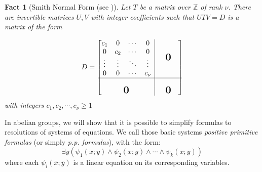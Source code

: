 \documentclass[11pt]{amsart}
\newcommand{\bigzero}{\mbox{\normalfont\Large\bfseries 0}}
\newcommand{\rvline}{\hspace*{-\arraycolsep}\vline\hspace*{-\arraycolsep}}
\newtheorem{fact}[prop]{Fact}
\theoremstyle{definition}
\newcommand{\bh}{\begin{fact}}
\newcommand{\eh}{\end{fact}}
\newcommand{\ov}[1]{\overline{#1}}
\begin{document}
\bh [Smith Normal Form (see \cite{Smith1861})] \label{Fact:SmithNormalForm} Let $T$ be a matrix over $\mathbb{Z}$ of rank $\nu$. There are invertible matrices $U,V$ with integer coefficients such that $UTV=D$ is a matrix of the form

\[
D=\begin{bmatrix}
  \begin{matrix}
  c_1 & 0 & \cdots & 0 \\
  0 & c_2 & \cdots & 0 \\
  \vdots & \vdots & \ddots & \vdots\\
  0 & 0 &\cdots & c_{\nu}
  \end{matrix}
  & \rvline & & \bigzero & \\
\hline
& \rvline &\\
  \bigzero & \rvline & & \bigzero
\end{bmatrix}
\]with integers $c_1,c_2,\cdots,c_\nu\geq 1$
\eh
In abelian groups, we will show that it is possible to simplify formulas to resolutions of systems of equations. We call those basic systems \emph{positive primitive formulas} (or simply \emph{p.p. formulas}), with the form: \[\exists \ov{y}(\psi_1(\ov{x};\ov{y})\wedge \psi_2(\ov{x};\ov{y})\wedge \cdots \wedge \psi_k(\ov{x};\ov{y}))\]
where each $\psi_i(\ov{x};\ov{y})$ is a linear equation on its corresponding variables.\\
\end{document}
